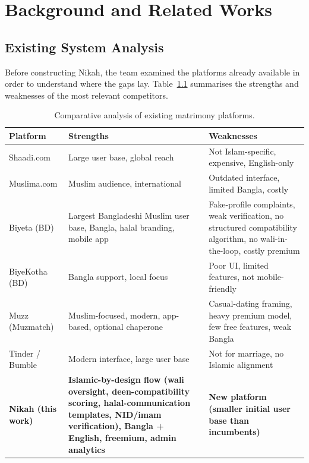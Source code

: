 \documentclass[12pt,a4paper]{report}
\begin{document}
\chapter{Background and Related Works}

\section{Existing System Analysis}
Before constructing Nikah, the team examined the platforms already available in
order to understand where the gaps lay. Table~\ref{tab:competitors} summarises
the strengths and weaknesses of the most relevant competitors.

\begin{table}[H]
\centering
\caption{Comparative analysis of existing matrimony platforms.}
\label{tab:competitors}
\small
\renewcommand{\arraystretch}{1.25}
\begin{tabularx}{\textwidth}{l X X}
\toprule
\textbf{Platform} & \textbf{Strengths} & \textbf{Weaknesses} \\
\midrule
Shaadi.com       & Large user base, global reach       & Not Islam-specific, expensive, English-only \\
Muslima.com      & Muslim audience, international       & Outdated interface, limited Bangla, costly  \\
Biyeta (BD)      & Largest Bangladeshi Muslim user base, Bangla, halal branding, mobile app & Fake-profile complaints, weak verification, no structured compatibility algorithm, no wali-in-the-loop, costly premium \\
BiyeKotha (BD)   & Bangla support, local focus          & Poor UI, limited features, not mobile-friendly \\
Muzz (Muzmatch)  & Muslim-focused, modern, app-based, optional chaperone & Casual-dating framing, heavy premium model, few free features, weak Bangla \\
Tinder / Bumble  & Modern interface, large user base    & Not for marriage, no Islamic alignment \\
\midrule
\textbf{Nikah (this work)} & \textbf{Islamic-by-design flow (wali oversight, deen-compatibility scoring, halal-communication templates, NID/imam verification), Bangla + English, freemium, admin analytics} & \textbf{New platform (smaller initial user base than incumbents)} \\
\bottomrule
\end{tabularx}
\end{table}
\end{document}
